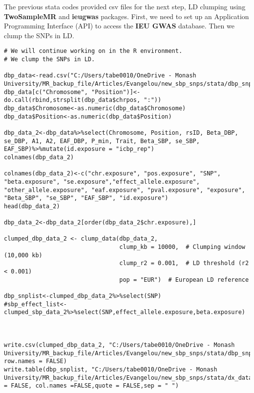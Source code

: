 \documentclass[11pt]{article}
\newcounter{subsubsubsection}[subsubsection]
\begin{document}
The previous stata codes provided csv files for the next step, LD clumping using \textbf{TwoSampleMR} and \textbf{ieugwas} packages. First, we need to set up an Application Programming Interface (API) to access the \textbf{IEU GWAS} database. Then we clump the SNPs in LD.
\color{violet}
\begin{lstlisting}[style=Rstyle]
# We will continue working on in the R environment. 
# We clump the SNPs in LD. 

dbp_data<-read.csv("C:/Users/tabe0010/OneDrive - Monash University/MR_backup_file/Articles/Evangelou/new_sbp_snps/stata/dbp_snps/all_dbp_snps.csv")
dbp_data[c("Chromosome", "Position")]<-do.call(rbind,strsplit(dbp_data$chrpos, ":"))
dbp_data$Chromosome<-as.numeric(dbp_data$Chromosome)
dbp_data$Position<-as.numeric(dbp_data$Position)

dbp_data_2<-dbp_data%>%select(Chromosome, Position, rsID, Beta_DBP, se_DBP, A1, A2, EAF_DBP, P_min, Trait, Beta_SBP, se_SBP, EAF_SBP)%>%mutate(id.exposure = "icbp_rep")
colnames(dbp_data_2)

colnames(dbp_data_2)<-c("chr.exposure", "pos.exposure", "SNP", "beta.exposure", "se.exposure","effect_allele.exposure", "other_allele.exposure", "eaf.exposure", "pval.exposure", "exposure", "Beta_SBP", "se_SBP", "EAF_SBP", "id.exposure")
head(dbp_data_2)

dbp_data_2<-dbp_data_2[order(dbp_data_2$chr.exposure),]

clumped_dbp_data_2 <- clump_data(dbp_data_2, 
                                 clump_kb = 10000,  # Clumping window (10,000 kb)
                                 clump_r2 = 0.001,  # LD threshold (r2 < 0.001)
                                 pop = "EUR")  # European LD reference

dbp_snplist<-clumped_dbp_data_2%>%select(SNP)
#sbp_effect_list<-clumped_sbp_data_2%>%select(SNP,effect_allele.exposure,beta.exposure)



write.csv(clumped_dbp_data_2, "C:/Users/tabe0010/OneDrive - Monash University/MR_backup_file/Articles/Evangelou/new_sbp_snps/stata/dbp_snps/dbp_exposure.csv", row.names = FALSE)
write.table(dbp_snplist, "C:/Users/tabe0010/OneDrive - Monash University/MR_backup_file/Articles/Evangelou/new_sbp_snps/stata/dx_data/dbp/data/dbp_snplist.txt",row.names = FALSE, col.names =FALSE,quote = FALSE,sep = " ")

\end{lstlisting}
\color{black}
\end{document}
